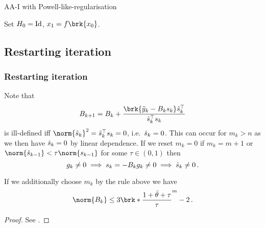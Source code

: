 \begin{frame}
	\begin{algorithm}[H]
	\caption{AA-I with Powell-like-regularisation}
	\color{gray}
	\BlankLine
	Set $H_0=\operatorname{Id}$, $x_1=f\brk{x_0}$.
	
	\end{algorithm}
\end{frame}

\subsection{Restarting iteration}
\begin{frame}
	\frametitle{Restarting iteration}
	Note that
	\begin{align*}
		B_{k+1} = B_k+\frac{\brk{\tiy_k-B_ks_k}\hs_k^\top}{\hs_k^\top s_k}
	\end{align*}
	is ill-defined iff $\norm{\hs_k}^2=\hs_k^\top s_k=0$, i.e.\ $\hat{s}_k=0$. This can occur for $m_k>n$ as we then have $\hat{s}_k=0$ by linear dependence.
	If we reset $m_k=0$ if $m_k=m+1$ or $\norm{\hs_{k-1}}<\tau\norm{s_{k-1}}$ for some $\tau\in(0,1)$
	then 
	$$g_k\neq 0 \implies s_k=-B_kg_k\neq 0\implies \hat{s}_k\neq 0\,.$$
\end{frame}

\begin{frame}
	\begin{lemma}
		If we additionally choose $m_k$ by the rule above we have
		\begin{align*}
			\norm{B_k}\leq 3\brk*{\frac{1+\bartheta+\tau}{\tau}}^m-2\,.
		\end{align*}
	\end{lemma}
	\begin{proof}
		See \cite[Lemma 3]{ZhaAA}.
	\end{proof}
\end{frame}

